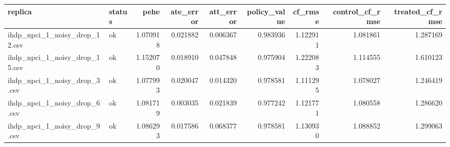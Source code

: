 \begin{tabular}{llrrrrrrr}
\toprule
replica & status & pehe & ate_error & att_error & policy_value & cf_rmse & control_cf_rmse & treated_cf_rmse \\
\midrule
ihdp_npci_1_noisy_drop_12.csv & ok & 1.070918 & 0.021882 & 0.006367 & 0.983936 & 1.122911 & 1.081861 & 1.287169 \\
ihdp_npci_1_noisy_drop_15.csv & ok & 1.152070 & 0.018910 & 0.047848 & 0.975904 & 1.222083 & 1.114555 & 1.610123 \\
ihdp_npci_1_noisy_drop_3.csv & ok & 1.077993 & 0.020047 & 0.014320 & 0.978581 & 1.111295 & 1.078027 & 1.246419 \\
ihdp_npci_1_noisy_drop_6.csv & ok & 1.081719 & 0.003035 & 0.021839 & 0.977242 & 1.121771 & 1.080558 & 1.286620 \\
ihdp_npci_1_noisy_drop_9.csv & ok & 1.086293 & 0.017586 & 0.068377 & 0.978581 & 1.130930 & 1.088852 & 1.299063 \\
\bottomrule
\end{tabular}
